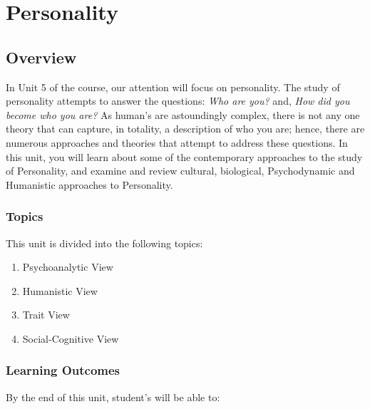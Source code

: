\documentclass[
]{book}
\providecommand{\tightlist}{%
  \setlength{\itemsep}{0pt}\setlength{\parskip}{0pt}}
\begin{document}
\hypertarget{personality}{%
\chapter{Personality}\label{personality}}

\hypertarget{overview-4}{%
\section*{Overview}\label{overview-4}}

In Unit 5 of the course, our attention will focus on personality. The study of personality attempts to answer the questions: \emph{Who are you?} and, \emph{How did you become who you are?} As human's are astoundingly complex, there is not any one theory that can capture, in totality, a description of who you are; hence, there are numerous approaches and theories that attempt to address these questions. In this unit, you will learn about some of the contemporary approaches to the study of Personality, and examine and review cultural, biological, Psychodynamic and Humanistic approaches to Personality.

\hypertarget{topics-4}{%
\subsection*{Topics}\label{topics-4}}

This unit is divided into the following topics:

\begin{enumerate}
\def\labelenumi{\arabic{enumi}.}
\tightlist
\item
  Psychoanalytic View\\
\item
  Humanistic View\\
\item
  Trait View\\
\item
  Social-Cognitive View
\end{enumerate}

\hypertarget{learning-outcomes-4}{%
\subsection*{Learning Outcomes}\label{learning-outcomes-4}}

By the end of this unit, student's will be able to:
\end{document}
